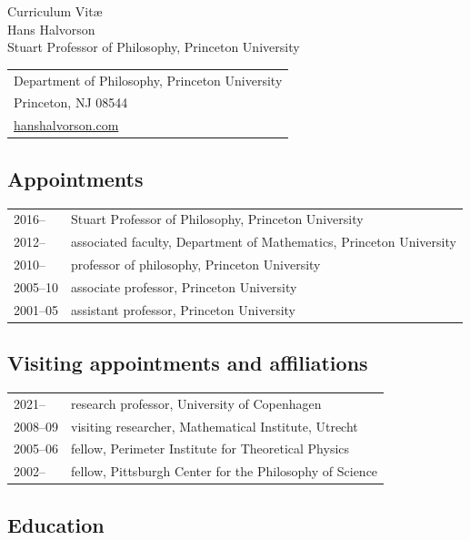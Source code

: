 \documentclass[11pt]{article}
\makeatletter
\newenvironment{dated}[1][ll]%
  {\begin{tabular}{@{}#1}}%
  {\end{tabular}}
\makeatother
\begin{document}
\thispagestyle{empty}

\vspace*{-4em}
\begin{center}
  {\Large\sc Curriculum Vit\ae} \\ \smallskip
  {\Large\sc Hans Halvorson} \\ \smallskip
  {\normalsize Stuart Professor of Philosophy, Princeton University}
\end{center}

\vspace{1em}
\begin{tabular}{@{}l}
  Department of Philosophy, Princeton University \\
  Princeton, NJ 08544 \\
  \href{https://hanshalvorson.com}{hanshalvorson.com}
\end{tabular}


\subsection*{Appointments}

\begin{dated}
  2016--   & Stuart Professor of Philosophy, Princeton University \\
  2012--   & associated faculty, Department of Mathematics, Princeton University \\
  2010--   & professor of philosophy, Princeton University \\
  2005--10 & associate professor, Princeton University \\
  2001--05 & assistant professor, Princeton University
\end{dated}

\subsection*{Visiting appointments and affiliations}

\begin{dated}
  2021--   & research professor, University of Copenhagen \\
  2008--09 & visiting researcher, Mathematical Institute, Utrecht \\
  2005--06 & fellow, Perimeter Institute for Theoretical Physics \\
  2002--   & fellow, Pittsburgh Center for the Philosophy of Science
\end{dated}

\subsection*{Education}
\end{document}
